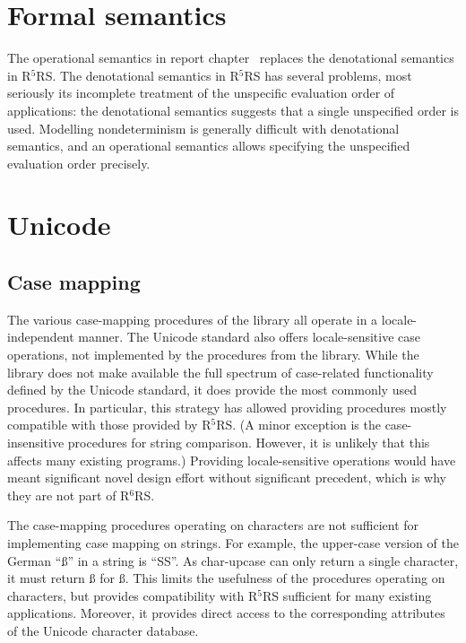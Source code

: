 \documentclass[twoside,twocolumn]{algol60}
\newcommand{\rn}[1]{R$^{#1}$RS}
\begin{document}
\chapter{Formal semantics}

The operational semantics in report
chapter~
replaces the denotational semantics in \rn{5}.  The denotational
semantics in \rn{5} has several problems, most seriously its
incomplete treatment of the unspecific evaluation order of
applications: the denotational semantics suggests that a single
unspecified order is used.  Modelling nondeterminism is generally
difficult with denotational semantics, and an operational semantics
allows specifying the unspecified evaluation order precisely.


\chapter{Unicode}

\section{Case mapping}

The various case-mapping procedures of the 
library all operate in a locale-independent manner.  The Unicode
standard also offers locale-sensitive case operations, not implemented
by the procedures from the  library.  While the
library does not make available the full spectrum of case-related
functionality defined by the Unicode standard, it does provide the
most commonly used procedures.  In particular, this strategy has
allowed providing procedures mostly compatible with those provided by
\rn{5}.  (A minor exception is the case-insensitive procedures for
string comparison.  However, it is unlikely that this affects many
existing programs.)  Providing locale-sensitive operations would have
meant significant novel design effort without significant precedent,
which is why they are not part of \rn{6}.

The case-mapping procedures operating on characters are not sufficient
for implementing case mapping on strings.  For example, the upper-case
version of the German ``\ss{}'' in a string is ``SS''.  As {\cf
  char-upcase} can only return a single character, it must return
\ss{} for \ss.  This limits the usefulness of the procedures
operating on characters, but provides compatibility with \rn{5}
sufficient for many existing applications.  Moreover, it provides
direct access to the corresponding attributes of the Unicode character
database.
\end{document}
